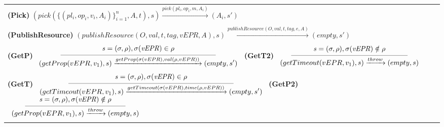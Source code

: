 \begin{table}[!h]
{{\begin{tabular}{l}
\hspace{2cm}\textbf{(Pick)}
$(pick(\{(pl_i,op_i,v_i,A_i)\}_{i=1}^n ,A,t),s)
\xrightarrow{pick(pl_i,op_i,m,A_i)}
(A_i,s')$

\\[-0.2cm]
\hspace{8cm}{\tiny $\textrm{where}\ {\it t \geq 1, v_i \in VAR, m \in \entero, pl_i \in PL,}\ \textrm{and} \ {\it s'=(\sigma[m/v_i],\rho), \forall i \in \{1..n\}}.$}
\\[0.2cm]

\hspace{2cm}\textbf{(PublishResource)}
$(publishResource(O,val,t,tag,vEPR,A),s)
\xrightarrow{publishResource(O,val,t,tag,e,A)}
(empty,s')
$\\
\hspace{2.4cm}{\tiny $\textrm{where}\ {\it t\geq 1, O \in ORCH, val \in \entero, vEPR \in VAR, e=getEPR()}\ \textrm{and}\ \it{s'=(\sigma[e/vEPR], \rho \cup \{O,e,val,\emptyset,t,tag,A\})}$.}

\\[0.2cm]

\textbf{(GetP)}\hspace{-0.3cm}
$\reglaa{ %
{\it s=(\sigma,\rho), \sigma(vEPR) \in \rho}
}
{ %
(getProp(vEPR,v_1),s)
\xrightarrow{getProp(\sigma(vEPR),val(\rho,vEPR))}
(empty,s')
}{7.7}$
\hspace{-0.3cm}\textbf{(GetT2)}\hspace{-0.2cm}
$\reglaa{ %
{\it s=(\sigma,\rho), \sigma(vEPR) \notin \rho}
}
{ %
(getTimeout(vEPR,v_1),s)
\xrightarrow{throw}
(empty,s)
}{5.8}$\\
\hspace{0.1cm}{\tiny where  ${\it vEPR,v_1 \in VAR}$ and ${\it s'=(\sigma[val(\rho,vEPR)/v_1],\rho)}$.}

\\[0.2cm]

\textbf{(GetT)}\hspace{-0.7cm}
$\reglaa{ %
{\it s=(\sigma,\rho), \sigma(vEPR) \in \rho}
}
{ %
(getTimeout(vEPR,v_1),s)
\xrightarrow{getTimeout(\sigma(vEPR),time(\rho,vEPR))}
(empty,s')
}{8.2}$
\hspace{-0.3cm}\textbf{(GetP2)}\hspace{-0.3cm}
$\reglaa{ %
{\it s=(\sigma,\rho), \sigma(vEPR) \notin \rho}
}
{ %
(getProp(vEPR,v_1),s)
\xrightarrow{throw}
(empty,s)
}{5}$
\\
\hspace{0.1cm}{\tiny where  ${\it vEPR,v_1 \in VAR}$ and ${\it s'=(\sigma[time(\rho,vEPR)/v_1],\rho)}$.}
\\[0.2cm]


\end{tabular}}}
\end{table}
